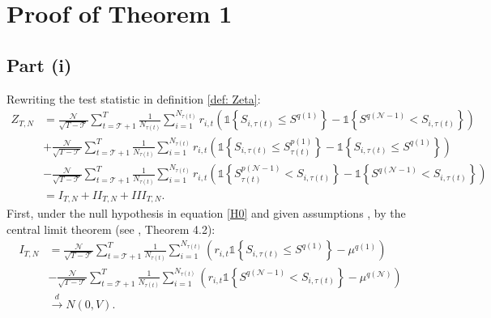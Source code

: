 
\section{Proof of Theorem 1}
\label{Proof of th:observable}

\subsection{Part (i)}

Rewriting the test statistic in definition \ref{def: Zeta}:
\begin{align*}
Z_{T,N} &= \frac{\mathcal{N}}{\sqrt{T-\mathcal{T}}}\sum_{t=\mathcal{T}+1}^{T}\frac{1}{N_{\tau(t)}} \sum_{i=1}^{N_{\tau(t)}} r_{i,t} \left( \mathds{1}\left\{ S_{i,\tau(t) }\leq S^{q(1)}\right\} - \mathds{1}\left\{ S^{q(\mathcal{N}-1)} < S_{i,\tau(t) }\right\} \right) \\
& + \frac{\mathcal{N}}{\sqrt{T-\mathcal{T}}}\sum_{t=\mathcal{T}+1}^{T}\frac{1}{N_{\tau(t)}} \sum_{i=1}^{N_{\tau(t)}}r_{i,t}\left( \mathds{1}\left\{ S_{i,\tau(t) }\leq S_{\tau(t) }^{p(1)}\right\} - \mathds{1}\left\{ S_{i,\tau(t) }\leq S^{q(1)}\right\} \right) \\
&- \frac{\mathcal{N}}{\sqrt{T-\mathcal{T}}}\sum_{t=\mathcal{T}+1}^{T}\frac{1}{N_{\tau(t)}} \sum_{i=1}^{N_{\tau(t)}}r_{i,t} \left( \mathds{1} \left\{ S_{\tau(t) }^{p(\mathcal{N} - 1)} < S_{i,\tau(t) } \right\} - \mathds{1}\left\{ S^{q(\mathcal{N} -1)} < S_{i,\tau(t) } \right\} \right) \\
&= I_{T,N} + II_{T,N} + III_{T,N}.
\end{align*}
First, under the null hypothesis in equation \eqref{H0} and given assumptions , by the central limit theorem (see \cite{rio2017asymptotic}, Theorem 4.2):
\begin{align*}
I_{T,N} &= \frac{\mathcal{N}}{\sqrt{T-\mathcal{T}}}\sum_{t=\mathcal{T}+1}^{T}\frac{1}{N_{\tau(t)}} \sum_{i=1}^{N_{\tau(t)}}\left( r_{i,t} \mathds{1}\left\{ S_{i,\tau(t) } \leq S^{q(1)}\right\} -\mu^{q(1)}\right) \\
& - \frac{\mathcal{N}}{\sqrt{T-\mathcal{T}}}\sum_{t=\mathcal{T}+1}^{T}\frac{1}{N_{\tau(t)}} \sum_{i=1}^{N_{\tau(t)}} \left( r_{i,t} \mathds{1}\left\{ S^{q(\mathcal{N} -1)} < S_{i,\tau(t) }\right\} -\mu^{q(\mathcal{N})}\right) \\
& \overset{d}{\rightarrow} N \left( 0, V \right).
\end{align*}
